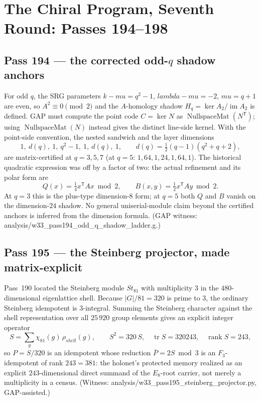 \documentclass[12pt,a4paper]{article}
\def\mathbb#1{#1}%
\def\mathrm#1{#1}%
\def\texttt#1{#1}%
\def\lambda{lambda}%
\def\mu{mu}%
\def\cdot{ }%
\theoremstyle{definition}
\begin{document}
\section{The Chiral Program, Seventh Round: Passes 194--198}
\label{sec:chiral-program-seven}

\subsection{Pass 194 --- the corrected odd-\texorpdfstring{$q$}{q} shadow anchors}
\label{ssec:pass194}

For odd $q$, the SRG parameters $k-\mu=q^2-1$,
$\lambda-\mu=-2$, $\mu=q+1$ are even, so $A^2\equiv0\pmod2$ and the
$A$-homology shadow $H_q=\ker A_2/\operatorname{im}A_2$ is defined.  GAP
must compute the point code $C=\ker N$ as
$\operatorname{NullspaceMat}(N^{\mathsf T})$; using
$\operatorname{NullspaceMat}(N)$ instead gives the distinct line-side
kernel.  With the point-side convention, the nested sandwich and the layer
dimensions
\[
  1,\ d(q),\ 1,\ q^2-1,\ 1,\ d(q),\ 1,
  \qquad d(q)=\tfrac12(q-1)(q^2+q+2),
\]
are matrix-certified at $q=3,5,7$ (at $q=5$:
$1,64,1,24,1,64,1$).  The historical quadratic expression was off by a
factor of two: the actual refinement and its polar form are
\[
  \boxed{Q(x)=\tfrac14x^{\mathsf T}Ax\bmod2},\qquad
  B(x,y)=\tfrac12x^{\mathsf T}Ay\bmod2.
\]
At $q=3$ this is the plus-type dimension-$8$ form; at $q=5$ both $Q$ and
$B$ vanish on the dimension-$24$ shadow.  No general uniserial-module
claim beyond the certified anchors is inferred from the dimension formula.
(GAP witness:
\texttt{analysis/w33\_pass194\_odd\_q\_shadow\_ladder.g}.)

\subsection{Pass 195 --- the Steinberg projector, made matrix-explicit}
\label{ssec:pass195}

Pass~190 located the Steinberg module $\mathrm{St}_{81}$ with multiplicity
$3$ in the $480$-dimensional eigenlattice shell. Because
$|G|/81=320$ is prime to $3$, the ordinary Steinberg idempotent is
$3$-integral. Summing the Steinberg character against the shell
representation over all $25\,920$ group elements gives an explicit integer
operator
\[
  S=\sum_{g}\chi_{81}(g)\,\rho_{\mathrm{shell}}(g),
  \qquad
  S^2=320\,S,\quad \operatorname{tr}S=320\cdot243,\quad
  \operatorname{rank}S=243,
\]
so $P=S/320$ is an idempotent whose reduction $\bar P=2S\bmod3$ is an
$\mathbb F_3$-idempotent of rank $243=3\cdot81$: the holonet's protected
memory realized as an explicit $243$-dimensional direct summand of the
$E_8$-root carrier, not merely a multiplicity in a census. (Witness:
\texttt{analysis/w33\_pass195\_steinberg\_projector.py}, GAP-assisted.)
\end{document}
